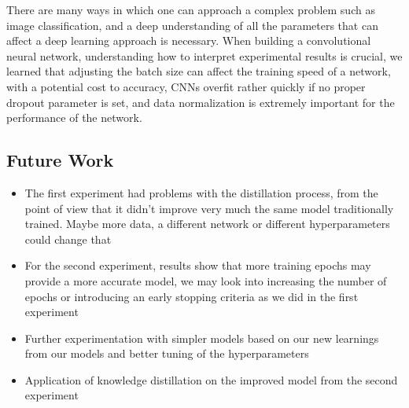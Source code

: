 There are many ways in which one can approach a complex problem such as image classification, and a deep understanding of all the parameters that can affect a deep learning approach is necessary.
When building a convolutional neural network, understanding how to interpret experimental results is crucial, we learned that adjusting the batch size can affect the training speed of a network, with a potential cost to accuracy, CNNs overfit rather quickly if no proper dropout parameter is set, and data normalization is extremely important for the performance of the network.

\subsection*{Future Work}
\begin{itemize}
    \item The first experiment had problems with the distillation process, from the point of view that it didn't improve very much the same model traditionally trained. Maybe more data, a different network or different hyperparameters could change that
    \item For the second experiment, results show that more training epochs may provide a more accurate model, we may look into increasing the number of epochs or introducing an early stopping criteria as we did in the first experiment
    \item Further experimentation with simpler models based on our new learnings from our models and better tuning of the hyperparameters
    \item Application of knowledge distillation on the improved model from the second experiment
\end{itemize}
